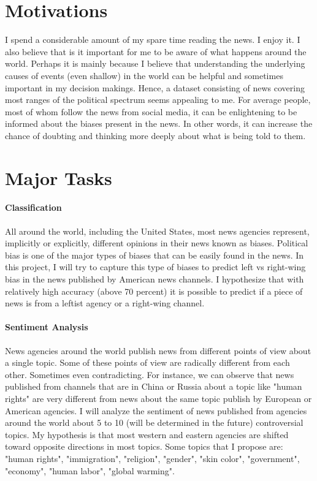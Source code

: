 \documentclass[11pt]{article}
\begin{document}
\section{Motivations}
I spend a considerable amount of my spare time reading the news. I enjoy it. I also believe that is it important for me to be aware of what happens around the world. Perhaps it is mainly because I believe that understanding the underlying causes of events (even shallow) in the world can be helpful and sometimes important in my decision makings. Hence, a dataset consisting of news covering most ranges of the political spectrum seems appealing to me. For average people, most of whom follow the news from social media, it can be enlightening to be informed about the biases present in the news. In other words, it can increase the chance of doubting and thinking more deeply about what is being told to them.

\section{Major Tasks}
\paragraph{Classification}
All around the world, including the United States, most news agencies represent, implicitly or explicitly, different opinions in their news known as biases. Political bias is one of the major types of biases that can be easily found in the news. In this project, I will try to capture this type of biases to predict left vs right-wing bias in the news published by American news channels. I hypothesize that with relatively high accuracy (above 70 percent) it is possible to predict if a piece of news is from a leftist agency or a right-wing channel.

\paragraph{Sentiment Analysis}
News agencies around the world publish news from different points of view about a single topic. Some of these points of view are radically different from each other. Sometimes even contradicting. For instance, we can observe that news published from channels that are in China or Russia about a topic like "human rights" are very different from news about the same topic publish by European or American agencies.
I will analyze the sentiment of news published from agencies around the world about 5 to 10 (will be determined in the future) controversial topics. My hypothesis is that most western and eastern agencies are shifted toward opposite directions in most topics. Some topics that I propose are: "human rights", "immigration", "religion", "gender", "skin color", "government", "economy", "human labor", "global warming".
\end{document}
